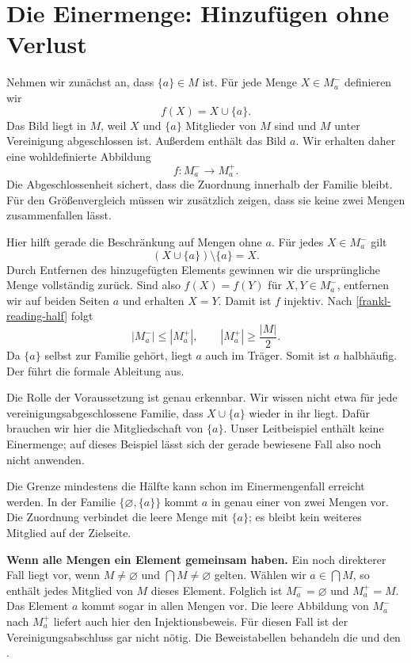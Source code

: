 \par{}
\section*{Die Einermenge: Hinzufügen ohne Verlust}
\hypertarget{frankl.reading.singleton}{}

Nehmen wir zunächst an, dass \(\{a\}\in M\) ist. Für jede
Menge \(X\in M_a^-\) definieren wir
\[
  f(X)=X\cup\{a\}.
\]
Das Bild liegt in \(M\), weil \(X\) und \(\{a\}\)
Mitglieder von \(M\) sind und \(M\) unter Vereinigung
abgeschlossen ist. Außerdem enthält das Bild \(a\).
Wir erhalten daher eine wohldefinierte Abbildung
\[
  f\colon M_a^-\longrightarrow M_a^+.
\]
Die Abgeschlossenheit sichert, dass die Zuordnung innerhalb
der Familie bleibt. Für den Größenvergleich müssen wir
zusätzlich zeigen, dass sie keine zwei Mengen zusammenfallen
lässt.

Hier hilft gerade die Beschränkung auf Mengen ohne \(a\).
Für jedes \(X\in M_a^-\) gilt
\[
  (X\cup\{a\})\setminus\{a\}=X.
\]
Durch Entfernen des hinzugefügten Elements gewinnen wir die
ursprüngliche Menge vollständig zurück. Sind also
\(f(X)=f(Y)\) für \(X,Y\in M_a^-\), entfernen wir auf
beiden Seiten \(a\) und erhalten \(X=Y\). Damit ist
\(f\) injektiv. Nach \eqref{frankl-reading-half} folgt
\[
  |M_a^-|\leq|M_a^+|,
  \qquad |M_a^+|\geq\frac{|M|}{2}.
\]
Da \(\{a\}\) selbst zur Familie gehört, liegt \(a\) auch
im Träger. Somit ist \(a\) halbhäufig.
Der  führt die formale Ableitung aus.

Die Rolle der Voraussetzung ist genau erkennbar. Wir wissen
nicht etwa für jede vereinigungsabgeschlossene Familie, dass
\(X\cup\{a\}\) wieder in ihr liegt. Dafür brauchen wir
hier die Mitgliedschaft von \(\{a\}\). Unser Leitbeispiel
enthält keine Einermenge; auf dieses Beispiel lässt sich der
gerade bewiesene Fall also noch nicht anwenden.

Die Grenze \glqq mindestens die Hälfte\grqq{} kann schon im
Einermengenfall erreicht werden. In der Familie
\(\{\varnothing,\{a\}\}\) kommt \(a\) in genau einer von
zwei Mengen vor. Die Zuordnung verbindet die leere Menge mit
\(\{a\}\); es bleibt kein weiteres Mitglied auf der Zielseite.

\medskip\noindent\textbf{Wenn alle Mengen ein Element gemeinsam haben.}
\hypertarget{frankl.reading.intersection}{}
Ein noch direkterer Fall liegt vor, wenn \(M\neq\varnothing\)
und \(\bigcap M\neq\varnothing\) gelten. Wählen wir
\(a\in\bigcap M\), so enthält jedes Mitglied von \(M\)
dieses Element. Folglich ist \(M_a^-=\varnothing\) und
\(M_a^+=M\). Das Element \(a\) kommt sogar in allen Mengen
vor. Die leere Abbildung von \(M_a^-\) nach \(M_a^+\)
liefert auch hier den Injektionsbeweis. Für diesen Fall ist
der Vereinigungsabschluss gar nicht nötig. Die Beweistabellen
behandeln die  und den
.

